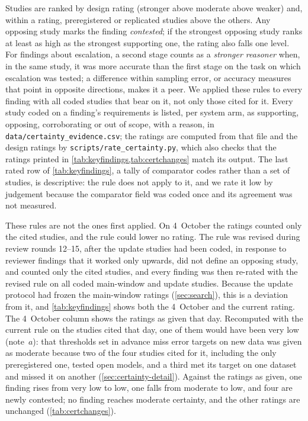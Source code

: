 Studies are ranked by design rating (stronger above moderate above weaker) and, within a rating, preregistered or replicated studies above the others.
Any opposing study marks the finding \emph{contested}; if the strongest opposing study ranks at least as high as the strongest supporting one, the rating also falls one level.
For findings about escalation, a second stage counts as a \emph{stronger reasoner} when, in the same study, it was more accurate than the first stage on the task on which escalation was tested; a difference within sampling error, or accuracy measures that point in opposite directions, makes it a peer.
We applied these rules to every finding with all coded studies that bear on it, not only those cited for it. Every study coded on a finding's requirements is listed, per system arm, as supporting, opposing, corroborating or out of scope, with a reason, in \nolinkurl{data/certainty_evidence.csv}; the ratings are computed from that file and the design ratings by \nolinkurl{scripts/rate_certainty.py}, which also checks that the ratings printed in \cref{tab:keyfindings,tab:certchanges} match its output.
The last rated row of \cref{tab:keyfindings}, a tally of comparator codes rather than a set of studies, is descriptive: the rule does not apply to it, and we rate it low by judgement because the comparator field was coded once and its agreement was not measured.

These rules are not the ones first applied. On 4~October the ratings counted only the cited studies, and the rule could lower no rating. The rule was revised during review rounds 12--15, after the update studies had been coded, in response to reviewer findings that it worked only upwards, did not define an opposing study, and counted only the cited studies, and every finding was then re-rated with the revised rule on all coded main-window and update studies. Because the update protocol had frozen the main-window ratings (\cref{sec:search}), this is a deviation from it, and \cref{tab:keyfindings} shows both the 4~October and the current rating.
The 4~October column shows the ratings as given that day. Recomputed with the current rule on the studies cited that day, one of them would have been very low (note~$a$): that thresholds set in advance miss error targets on new data was given as moderate because two of the four studies cited for it, including the only preregistered one, tested open models, and a third met its target on one dataset and missed it on another (\cref{sec:certainty-detail}). Against the ratings as given, one finding rises from very low to low, one falls from moderate to low, and four are newly contested; no finding reaches moderate certainty, and the other ratings are unchanged (\cref{tab:certchanges}).

